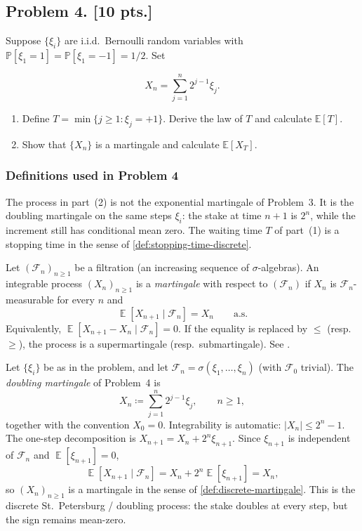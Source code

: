 \documentclass[11pt,a4paper]{article}
\DeclareMathOperator{\E}{\mathbb{E}}
\begin{document}
\subsection{Problem 4. [10 pts.]}
Suppose \( \{\xi_i\} \) are i.i.d.\ Bernoulli random variables with \( \mathbb{P}[\xi_1 = 1] = \mathbb{P}[\xi_1 = -1] = 1/2 \). Set

\[
X_n = \sum_{j=1}^n 2^{j-1} \xi_j.
\]

\begin{enumerate}[label=(\arabic*)]
    \item Define \( T = \min\{j \ge 1 : \xi_j = +1\} \). Derive the law of \( T \) and calculate \( \mathbb{E}[T] \).
    \item Show that \( \{X_n\} \) is a martingale and calculate \( \mathbb{E}[X_T] \).
\end{enumerate}

\setcounter{section}{4}

\subsubsection{Definitions used in Problem 4}

The process in part~(2) is not the exponential martingale of Problem~3. It is the doubling martingale on the same steps \( \xi_i \): the stake at time \( n+1 \) is \( 2^{n} \), while the increment still has conditional mean zero. The waiting time \( T \) of part~(1) is a stopping time in the sense of \cref{def:stopping-time-discrete}.

\begin{definition}
\label{def:discrete-martingale}
Let \( (\mathcal{F}_n)_{n\ge 1} \) be a filtration (an increasing sequence of \(\sigma\)-algebras). An integrable process \( (X_n)_{n\ge 1} \) is a \emph{martingale} with respect to \( (\mathcal{F}_n) \) if \( X_n \) is \(\mathcal{F}_n\)-measurable for every \( n \) and
\[
\E[X_{n+1}\mid\mathcal{F}_n]=X_n
\qquad\text{a.s.}
\]
Equivalently, \( \E[X_{n+1}-X_n\mid\mathcal{F}_n]=0 \). If the equality is replaced by \( \le \) (resp.\ \( \ge \)), the process is a supermartingale (resp.\ submartingale). See \citep[\S5.2]{durrett2010}.
\end{definition}

\begin{definition}
\label{def:doubling-martingale}
Let \( \{\xi_i\} \) be as in the problem, and let \( \mathcal{F}_n=\sigma(\xi_1,\dots,\xi_n) \) (with \( \mathcal{F}_0 \) trivial). The \emph{doubling martingale} of Problem~4 is
\[
X_n
\coloneqq
\sum_{j=1}^{n}2^{j-1}\xi_j,
\qquad
n\ge 1,
\]
together with the convention \( X_0=0 \). Integrability is automatic: \( |X_n|\le 2^{n}-1 \). The one-step decomposition is \( X_{n+1}=X_n+2^{n}\xi_{n+1} \). Since \( \xi_{n+1} \) is independent of \( \mathcal{F}_n \) and \( \E[\xi_{n+1}]=0 \),
\[
\E[X_{n+1}\mid\mathcal{F}_n]
=
X_n+2^{n}\E[\xi_{n+1}]
=
X_n,
\]
so \( (X_n)_{n\ge 1} \) is a martingale in the sense of \cref{def:discrete-martingale}. This is the discrete St.\ Petersburg / doubling process: the stake doubles at every step, but the sign remains mean-zero.
\end{definition}
\end{document}
